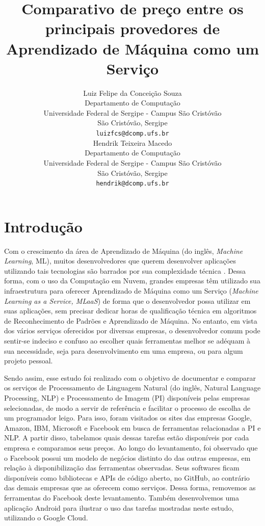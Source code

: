 \documentclass{article}
\title{Comparativo de preço entre os principais provedores de Aprendizado de Máquina como um Serviço}
\author{
  Luiz Felipe da Conceição Souza \\
  Departamento de Computação\\
  Universidade Federal de Sergipe - Campus São Cristóvão\\
  São Cristóvão, Sergipe \\
  \texttt{luizfcs@dcomp.ufs.br} \\
   \And
 Hendrik Teixeira Macedo \\
  Departamento de Computação\\
 Universidade Federal de Sergipe - Campus São Cristóvão\\
  São Cristóvão, Sergipe \\
  \texttt{hendrik@dcomp.ufs.br} \\
}
\begin{document}
\maketitle

\begin{abstract}
\lipsum[1]
\end{abstract}


\section{Introdução}
Com o crescimento da área de Aprendizado de Máquina (do inglês, \textit{Machine Learning}, ML)\cite{alpaydin2014introduction}, muitos desenvolvedores que querem desenvolver aplicações utilizando tais tecnologias são barrados por sua complexidade técnica \cite{ribeiro2015}. Dessa forma, com o uso da Computação em Nuvem, grandes empresas têm utilizado sua infraestrutura para oferecer Aprendizado de Máquina como um Serviço (\textit{Machine Learning as a Service, MLaaS}) de forma que o desenvolvedor possa utilizar em suas aplicações, sem precisar dedicar horas de qualificação técnica em algoritmos de Reconhecimento de Padrões e Aprendizado de Máquina. No entanto, em vista dos vários serviços oferecidos por diversas empresas, o desenvolvedor comum pode sentir-se indeciso e confuso ao escolher quais ferramentas melhor se adéquam à sua necessidade, seja para desenvolvimento em uma empresa, ou para algum projeto pessoal.

Sendo assim, esse estudo foi realizado com o objetivo de documentar e comparar os serviços de Processamento de Linguagem Natural (do inglês, Natural Language Processing, NLP) e Processamento de Imagem (PI) disponíveis pelas empresas selecionadas, de modo a servir de referência e facilitar o processo de escolha de um programador leigo. Para isso, foram visitados os sites das empresas Google, Amazon, IBM, Microsoft e Facebook em busca de ferramentas relacionadas a PI e NLP. A partir disso, tabelamos quais dessas tarefas estão disponíveis por cada empresa e comparamos seus preços. Ao longo do levantamento, foi observado que o Facebook possui um modelo de negócios distinto do das outras empresas, em relação à disponibilização das ferramentas observadas. Seus softwares ficam disponíveis como bibliotecas e APIs de código aberto, no GitHub, ao contrário das demais empresas que as oferecem como serviços. Dessa forma, removemos as ferramentas do Facebook deste levantamento. Também desenvolvemos uma aplicação Android para ilustrar o uso das tarefas mostradas neste estudo, utilizando o Google Cloud.
\end{document}
